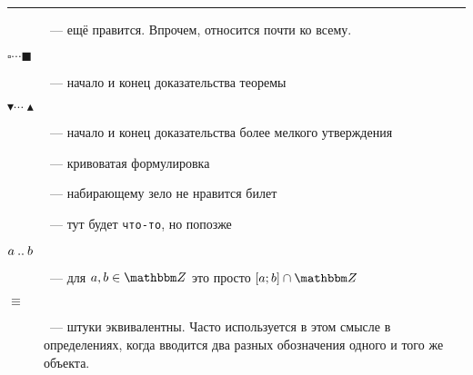\documentclass[12pt]{../../notes}
\begin{document}
\noindent\rule{\textwidth}{0.01em}

\begin{description}
  \item[\underdev]~--- ещё правится. Впрочем, относится почти ко всему.
  \item[$\square\cdots\blacksquare$]~--- начало и конец доказательства теоремы
  \item[$\blacktriangledown\cdots\blacktriangle$]~--- начало и конец доказательства более мелкого 
    утверждения
  \item[\sour]~--- кривоватая формулировка
  \item[\flame]~--- набирающему зело не нравится билет
  \item[]~--- тут будет \texttt{что-то}, но попозже
  \item[$a\mathbin{..} b$]~--- для $a,b \in \Z$ это просто $[a;b]\cap \Z$
  \item[$\equiv$]~--- штуки эквивалентны. Часто используется в этом смысле в
    определениях, когда вводится два разных обозначения одного и того же
    объекта.
\end{description}
\end{document}
